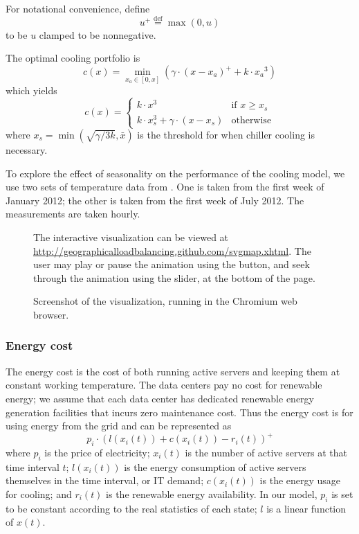 \documentclass{acm_proc_article-sp}
\newcommand{\eqdef}{\ensuremath{\overset{\mathrm{def}}{=}}}
\begin{document}
For notational convenience, define
\begin{equation}
	u^+ \eqdef \max(0, u)
\end{equation}
to be $u$ clamped to be nonnegative.

The optimal cooling portfolio is
\begin{equation}
c(x) = \min_{x_a \in [0,x]}\left( \gamma \cdot (x-x_a)^+ + k \cdot {x_a}^3 \right)
\end{equation}
which yields
$$
c(x) = \left\{ \begin{array}{ll}
	k \cdot x^3 & \mbox{if $x \geq x_s$}\\
	k \cdot x_s^3 + \gamma \cdot (x-x_s) & \mbox{otherwise}\end{array} \right.
$$
where $x_s = \min \left(\sqrt{\gamma/3k}, \bar{x}\right)$ is the threshold for when chiller cooling is necessary.

To explore the effect of seasonality on the performance of the cooling model, we use two sets of temperature data from \cite{temp}. One is taken from the first week of January 2012; the other is taken from the first week of July 2012. The measurements are taken hourly.

\begin{figure*}
\centering
{}
\caption{Screenshot of the visualization, running in the Chromium web browser.}

The interactive visualization can be viewed at \url{http://geographicalloadbalancing.github.com/svgmap.xhtml}. The user may play or pause the animation using the button, and seek through the animation using the slider, at the bottom of the page.
\label{fig:screenshot}
\end{figure*}

\subsubsection{Energy cost}
The energy cost is the cost of both running active servers and keeping them at constant working temperature. The data centers pay no cost for renewable energy; we assume that each data center has dedicated renewable energy generation facilities that incurs zero maintenance cost. Thus the energy cost is for using energy from the grid and can be represented as
\begin{equation}
p_i \cdot (l(x_i(t)) + c(x_i(t)) - r_i(t))^+
\end{equation}
where $p_i$ is the price of electricity; $x_i(t)$ is the number of active servers at that time interval $t$; $l(x_i(t))$ is the energy consumption of active servers themselves in the time interval, or IT demand; $c(x_i(t))$ is the energy usage for cooling; and $r_i(t)$ is the renewable energy availability. In our model, $p_i$ is set to be constant according to the real statistics of each state; $l$ is a linear function of $x(t)$.
\end{document}
